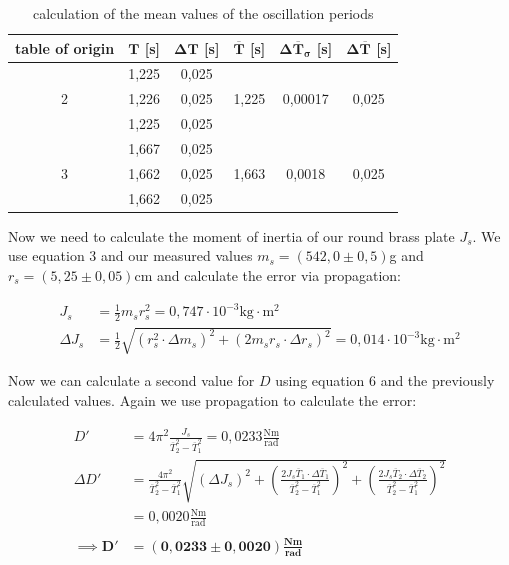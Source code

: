 \documentclass{article}
\begin{document}
\begin{table}[!ht]
    \centering
    \begin{tabular}{c|c|c|c|c|c}
        \textbf{table of origin} & $\bm{T}$ [s] & $\bm{\Delta T}$ [s] & $\bm{\overline{T}}$ [s] & $\bm{\Delta \overline{T}_\sigma}$ [s] & $\bm{\Delta \overline{T}}$ [s] \\ \hline
         & 1,225 & 0,025 &  &  &  \\
        2 & 1,226 & 0,025 & 1,225 & 0,00017 & 0,025 \\
         & 1,225 & 0,025 &  &  &  \\ \hline
         & 1,667 & 0,025 &  &  &  \\
        3 & 1,662 & 0,025 & 1,663 & 0,0018 & 0,025 \\
         & 1,662 & 0,025 &  &  &  \\
    \end{tabular}
    \caption{calculation of the mean values of the oscillation periods}
\end{table}

Now we need to calculate the moment of inertia of our round brass plate $J_s$. We use equation 3 and our measured values $m_s = (542,0\pm0,5)$g and $r_s=(5,25\pm0,05)$cm and calculate the error via propagation:

\begin{equation}
    \begin{split}
        J_s &= \frac{1}{2}m_sr_s^2 = 0,747 \cdot 10^{-3} \text{kg} \cdot \text{m}^2 \\
        \Delta J_s &= \frac{1}{2} \sqrt{\left( r_s^2 \cdot \Delta m_s \right)^2 + \left( 2 m_s r_s \cdot \Delta r_s \right)^2} = 0,014 \cdot 10^{-3} \text{kg} \cdot \text{m}^2 
    \end{split}
\end{equation}

Now we can calculate a second value for $D$ using equation 6 and the previously calculated values. Again we use propagation to calculate the error:

\begin{equation}
\begin{split}
    D' &= 4\pi^2 \frac{J_s}{\overline{T}_2^2 - \overline{T}_1^2} = 0,0233 \frac{\text{Nm}}{\text{rad}} \\
    \Delta D' &= \frac{4\pi^2}{\overline{T}_2^2 - \overline{T}_1^2} \sqrt{(\Delta J_s)^2 + \left( \frac{2 J_s \overline{T}_1 \cdot \Delta \overline{T}_1}{\overline{T}_2^2 - \overline{T}_1^2} \right)^2 + \left( \frac{2 J_s \overline{T}_2 \cdot \Delta \overline{T}_2}{\overline{T}_2^2 - \overline{T}_1^2} \right)^2} \\
    &= 0,0020 \frac{\text{Nm}}{\text{rad}} \\ \\
    \implies \bm{D'} &= \bm{(0,0233 \pm 0,0020)} \frac{\textbf{Nm}}{\textbf{rad}}
\end{split}
\end{equation}
\end{document}
